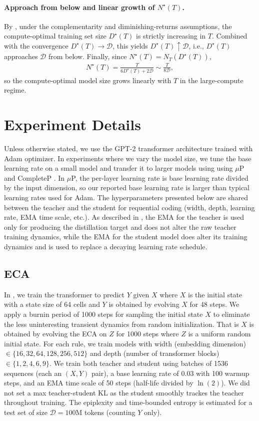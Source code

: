 \documentclass[twoside]{article}
\newcommand{\mup}{$\mu$P}
\newcommand{\D}{\mathcal{D}}
\begin{document}
\paragraph{Approach from below and linear growth of $N^\star(T)$.}
By , under the complementarity and diminishing-returns assumptions, the compute-optimal training set size $D^\star(T)$ is strictly increasing in $T$. Combined with the convergence $D^\star(T) \to \D$, this yields $D^\star(T) \uparrow \D$, i.e., $D^\star(T)$ approaches $\D$ from below. Finally, since $N^\star(T) = N_T(D^\star(T))$,
\begin{align}
    N^\star(T) = \frac{T}{6D^\star(T) + 2\D} \sim \frac{T}{8\D},
\end{align}
so the compute-optimal model size grows linearly with $T$ in the large-compute regime.


\section{Experiment Details}\label{app:experiment_details}
Unless otherwise stated, we use the GPT-2 \citep{radford2019language} transformer architecture trained with Adam optimizer. In experiments where we vary the model size, we tune the base learning rate on a small model and transfer it to larger models using using $\mu$P \citep{yang2022tensor} and CompleteP \citep{dey2025don}. In \mup, the per-layer learning rate is base learning rate divided by the input dimension, so our reported base learning rate is larger than typical learning rates used for Adam. The hyperparameters presented below are shared between the teacher and the student for requential coding (width, depth, learning rate, EMA time scale, etc.). As described in , the EMA for the teacher is used only for producing the distillation target and does not alter the raw teacher training dynamics, while the EMA for the student model does alter its training dynamics and is used to replace a decaying learning rate schedule. 

\subsection{ECA}\label{app:eca}
In , we train the transformer to predict $Y$ given $X$ where $X$ is the initial state with a state size of 64 cells and $Y$ is obtained by evolving $X$ for 48 steps. We apply a burnin period of 1000 steps for sampling the initial state $X$ to eliminate the less uninteresting transient dynamics from random initialization. That is $X$ is obtained by evolving the ECA on $Z$ for 1000 steps where $Z$ is a uniform random initial state. For each rule, we train models with width (embedding dimension) $\in \{16,32,64,128,256,512\}$ and depth (number of transformer blocks) $\in \{1,2,4,6,9\}$. We train both teacher and student using batches of 1536 sequences (each an $(X,Y)$ pair), a base learning rate of 0.03 with 100 warmup steps, and an EMA time scale of 50 steps (half-life divided by $\ln(2)$). We did not set a max teacher-student KL as the student smoothly trackes the teacher throughout training. The epiplexity and time-bounded entropy is estimated for a test set of size $\D=100$M tokens (counting $Y$ only).
\end{document}
